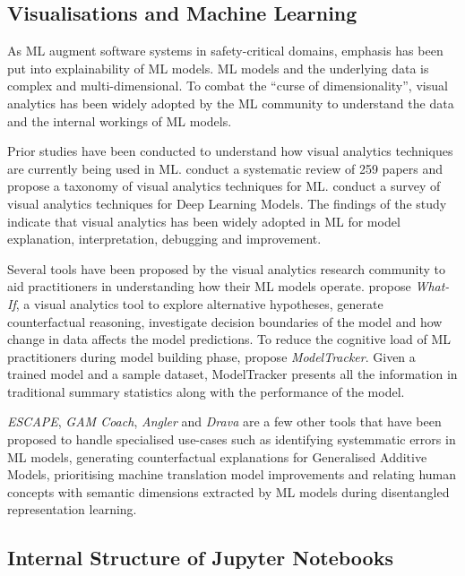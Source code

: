 \documentclass[conference]{IEEEtran}
\begin{document}
\subsection{Visualisations and Machine Learning}\label{sec:visualisations}

As ML augment software systems in safety-critical domains, emphasis
has been put into explainability of ML models. ML models and the
underlying data is complex and multi-dimensional. To combat the
``curse of dimensionality'', visual analytics has been widely adopted
by the ML community to understand the data and the internal workings
of ML models.

Prior studies have been conducted to understand how visual analytics
techniques are currently being used in ML. \cite{yuan2021survey}
conduct a systematic review of 259 papers and propose a taxonomy of
visual analytics techniques for ML. \cite{hohman2019visual} conduct
a survey of visual analytics techniques for Deep Learning Models. The
findings of the study indicate that visual analytics has been widely
adopted in ML for model explanation, interpretation, debugging and
improvement.

Several tools have been proposed by the visual analytics research
community to aid practitioners in understanding how their ML models
operate. \cite{wexler2020if} propose \textit{What-If}, a visual
analytics tool to explore alternative hypotheses, generate
counterfactual reasoning, investigate decision boundaries of the model
and how change in data affects the model predictions. To reduce the
cognitive load of ML practitioners during model building phase,
\cite{amershi2015modeltracker} propose \textit{ModelTracker}. Given
a trained model and a sample dataset, ModelTracker presents all the
information in traditional summary statistics along with the
performance of the model.

\textit{ESCAPE}, \textit{GAM Coach}, \textit{Angler} and
\textit{Drava} are a few other tools that have been proposed to handle
specialised use-cases such as identifying systemmatic errors in ML
models, generating counterfactual explanations for Generalised
Additive Models, prioritising machine translation model improvements
and relating human concepts with semantic dimensions extracted by ML
models during disentangled representation learning\cite{ahn2023escape,
wang2023gam, robertson2023angler, wang2023drava}.

\subsection{Internal Structure of Jupyter Notebooks}\label{sec:nbformat}
\end{document}
